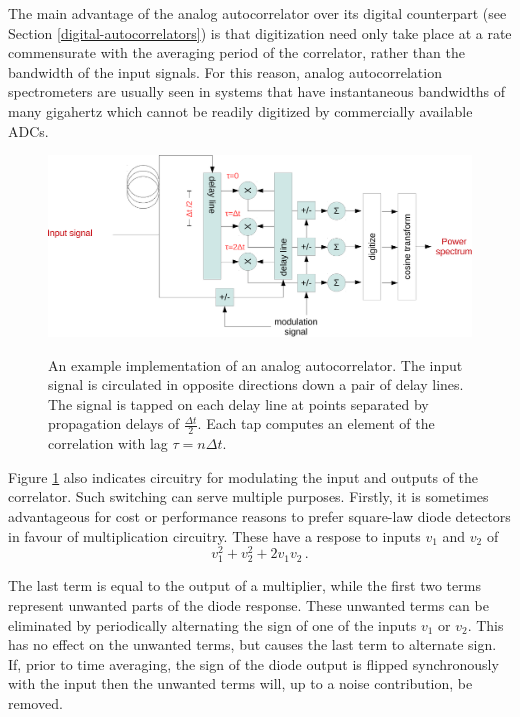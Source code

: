 \documentclass{ws-rv961x669}
\begin{document}
The main advantage of the analog autocorrelator over its digital counterpart (see Section \ref{digital-autocorrelators}) is that digitization need only take place at a rate commensurate with the averaging period of the correlator, rather than the bandwidth of the input signals. For this reason, analog autocorrelation spectrometers are usually seen in systems that have instantaneous bandwidths of many gigahertz which cannot be readily digitized by commercially available ADCs.


\begin{figure}
 \centering
 \includegraphics[width=\textwidth]{./figures/analog-autocorr-crop.pdf}
 \label{fig:analog-autocorr}
 \caption{An example implementation of an analog autocorrelator. The input signal is circulated in opposite directions down a pair of delay lines. The signal is tapped on each delay line at points separated by propagation delays of $\frac{\Delta t}{2}$. Each tap computes an element of the correlation with lag $\tau=n\Delta t$.}
\end{figure}

Figure \ref{fig:analog-autocorr} also indicates circuitry for modulating the input and outputs of the correlator. Such switching can serve multiple purposes. Firstly, it is sometimes advantageous for cost or performance reasons to prefer square-law diode detectors in favour of multiplication circuitry. These have a respose to inputs $v_1$ and $v_2$ of
\begin{equation}
 v_1^2 + v_2^2 + 2v_1v_2 \, .
\end{equation}

The last term is equal to the output of a multiplier, while the first two terms represent unwanted parts of the diode response. These unwanted terms can be eliminated by periodically alternating the sign of one of the inputs $v_1$ or $v_2$. This has no effect on the unwanted terms, but causes the last term to alternate sign. If, prior to time averaging, the sign of the diode output is flipped synchronously with the input then the unwanted terms will, up to a noise contribution, be removed.
\end{document}

